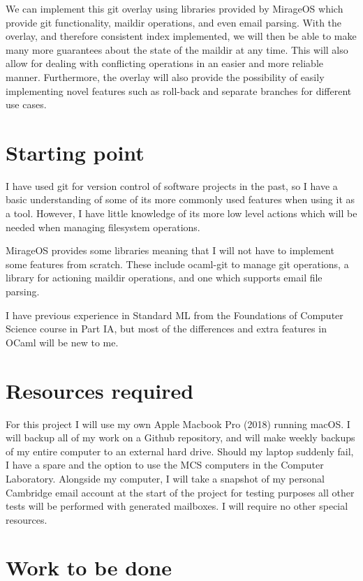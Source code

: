\documentclass[12pt,a4paper,twoside]{article}
\begin{document}
We can implement this git overlay using libraries provided by MirageOS which provide git functionality, maildir operations, and even email parsing. With the overlay, and therefore consistent index implemented, we will then be able to make many more guarantees about the state of the maildir at any time. This will also allow for dealing with conflicting operations in an easier and more reliable manner. Furthermore, the overlay will also provide the possibility of easily implementing novel features such as roll-back and separate branches for different use cases.

\section*{Starting point}

I have used git for version control of software projects in the past, so I have a basic understanding of some of its more commonly used features when using it as a tool. However, I have little knowledge of its more low level actions which will be needed when managing filesystem operations.

MirageOS provides some libraries meaning that I will not have to implement some features from scratch. These include ocaml-git to manage git operations, a library for actioning maildir operations, and one which supports email file parsing.

I have previous experience in Standard ML from the Foundations of Computer Science course in Part IA, but most of the differences and extra features in OCaml will be new to me.

\section*{Resources required}

For this project I will use my own Apple Macbook Pro (2018) running macOS.
I will backup all of my work on a Github repository, and will make weekly backups of my entire computer to an external hard drive. Should my laptop suddenly fail, I have a spare and the option to use the MCS computers in the Computer Laboratory. Alongside my computer, I will take a snapshot of my personal Cambridge email account at the start of the project for testing purposes all other tests will be performed with generated mailboxes. I will require no other special resources.

\section*{Work to be done}
\end{document}
